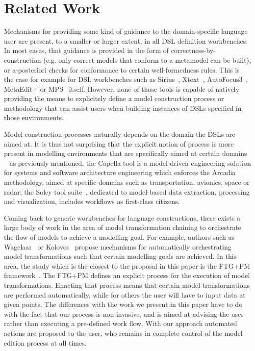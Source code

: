 \section{Related Work}
\label{sec:related_work}
 \vspace{-.3cm}
Mechanisms for providing some kind of guidance to the domain-specific
language user are present, to a smaller or larger extent, in all DSL definition
workbenches. In most cases, that guidance is provided in the form of
correctness-by-construction (e.g. only correct models that conform to a
metamodel can be built), or a-posteriori checks for conformance to certain
well-formedness rules. This is the case for example for DSL workbenches such as
Sirius~\cite{DBLP:conf/asplos/HauswaldLZLRKDM15},
Xtext~\cite{DBLP:conf/oopsla/EysholdtB10}, AutoFocus3~\cite{AF315},
MetaEdit+\cite{DBLP:conf/sle/Tolvanen16} or MPS~\cite{DBLP:conf/pppj/PechSV13}
itself. However, none of those tools is capable of natively providing the means
to explicitely define a model construction process or methodology that can
assist users when building instances of DSLs specified in those environments.

Model construction processes naturally depends on the domain the DSLs are aimed
at. It is thus not surprising that the explicit notion of process is more
present in modelling environments that are specifically aimed at certain domains
-- as previously mentioned, the Capella tool is a model-driven engineering
solution for systems and software architecture engineering which enforces the
Arcadia~\cite{DBLP:conf/syscon/BonnetVEN16} methodology, aimed at specific
domains such as transportation, avionics, space or radar; the Soley tool
suite~\cite{soley}, dedicated to model-based data extraction, processing and
visualization, includes workflows as first-class citizens.

Coming back to generic workbenches for language constructions, there exists a
large body of work in the area of model transformation chaining to orchestrate
the flow of models to achieve a modelling goal. For example, authors such as
Wagelaar~\cite{wagelaar2006blackbox}  or Kolovos~\cite{Kolovos2008} propose
mechanisms for automatically orchestrating model transformations such that
certain modelling goals are achieved. In this area, the study which is the
closest to the proposal in this paper is the FTG+PM
framework~\cite{DBLP:conf/sdl/LucioMDVJ13,MustafizDLV12}. The FTG+PM defines an
explicit process for the execution of model transformations.
Enacting that process means that certain model transformations are performed
automatically, while for others the user will have to input data at given
points. The differences with the work we present in this paper have to do with
the fact that our process is non-invasive, and is aimed at advising the user
rather than executing a pre-defined work flow. With our approach automated
actions are proposed to the user, who remains in complete control of the model
edition process at all times.

